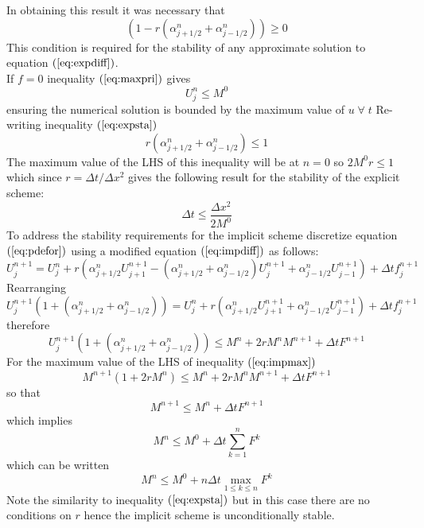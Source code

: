 \documentclass[11pt]{article}
\newcommand{\D}{\Delta}
\begin{document}
In obtaining this result it was necessary that  
\begin{equation}
\label{eq:expsta1}
(1 - r(\alpha_{j+1/2}^n+\alpha_{j-1/2}^n)) \geq 0  
\end{equation}
This condition is required for the stability of any approximate solution to equation $(\ref{eq:expdiff})$.\\ If $f = 0$ inequality $(\ref{eq:maxpri})$ gives 
\begin{equation*}
U_j^n \leq M^0
\end{equation*}
ensuring the numerical solution is bounded by the maximum value of $u \;\forall \; t$
Re-writing inequality $(\ref{eq:expsta})$
\begin{equation*}
r(\alpha_{j+1/2}^n+\alpha_{j-1/2}^n) \leq 1
\end{equation*}
The maximum value of the LHS of this inequality will be at $n=0$ so $ 2M^0r \leq 1$ which since $r = \D{t}/\D{x^2}$ gives the following result for the stability of the explicit scheme:
\begin{equation}
\label{eq:expsta1}
\D{t} \leq \frac{\D{x^2}}{2M^0}
\end{equation}
To address the stability requirements for the implicit scheme discretize equation $(\ref{eq:pdefor})$ using a modified equation $(\ref{eq:impdiff})$ as follows:
\begin{equation*}
U_j^{n+1} = U_j^n + r(\alpha_{j+1/2}^nU_{j+1}^{n+1} - (\alpha_{j+1/2}^n+\alpha_{j-1/2}^n)U_j^{n+1}+\alpha_{j-1/2}^nU_{j-1}^{n+1}) + \D{t}f_j^{n+1}
\end{equation*}
Rearranging
\begin{equation*}
U_j^{n+1}( 1+  (\alpha_{j+1/2}^n+\alpha_{j-1/2}^n) ) = U_j^n + r(\alpha_{j+1/2}^nU_{j+1}^{n+1} +\alpha_{j-1/2}^nU_{j-1}^{n+1}) + \D{t}f_j^{n+1}
\end{equation*}
therefore
\begin{equation}
\label{eq:impmax}
U_j^{n+1}( 1+  (\alpha_{j+1/2}^n+\alpha_{j-1/2}^n) ) \leq M^n + 2rM^nM^{n+1} + \D{t}F^{n+1}
\end{equation}
For the maximum value of the LHS of inequality $(\ref{eq:impmax})$
\begin{equation*} 
M^{n+1}(1+2rM^n) \leq M^n + 2rM^nM^{n+1} + \D{t}F^{n+1}
\end{equation*}
so that
\begin{equation*} 
M^{n+1} \leq M^n + \D{t}F^{n+1}
\end{equation*}
which implies
\begin{equation*}
M^n \leq M^0 + \D{t}\sum_{k=1}^n{F^k}
\end{equation*}
which can be written
\begin{equation}
\label{eq:impsta}
M^n \leq M^0 + n\D{t}\max_{1\leq{k}\leq{n}}{F^k}
\end{equation}
Note the similarity to inequality $(\ref{eq:expsta})$ but in this case there are no conditions on $r$ hence the implicit scheme is unconditionally stable.
%
%
%
\end{document}
